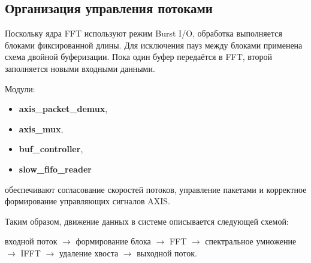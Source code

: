 \subsection{Организация управления потоками}

Поскольку ядра FFT используют режим Burst I/O, обработка выполняется блоками фиксированной длины. Для исключения пауз между блоками применена схема двойной буферизации. Пока один буфер передаётся в FFT, второй заполняется новыми входными данными.

Модули:
\begin{itemize}
	\item \textbf{axis\_packet\_demux},
	\item \textbf{axis\_mux},
	\item \textbf{buf\_controller},
	\item \textbf{slow\_fifo\_reader}
\end{itemize}
обеспечивают согласование скоростей потоков, управление пакетами и корректное формирование управляющих сигналов AXIS.

Таким образом, движение данных в системе описывается следующей схемой:

\begin{center}
	входной поток $\rightarrow$ формирование блока $\rightarrow$ FFT $\rightarrow$ спектральное умножение $\rightarrow$ IFFT $\rightarrow$ удаление хвоста $\rightarrow$ выходной поток.
\end{center}





